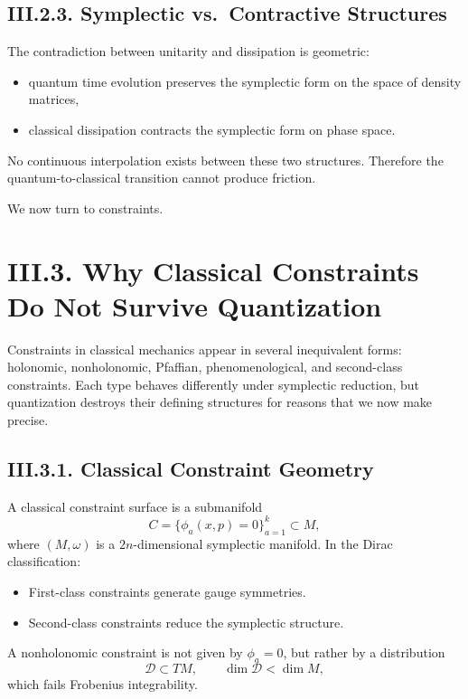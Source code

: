 \documentclass[12pt,oneside]{book}
\theoremstyle{plain}
\theoremstyle{definition}
\begin{document}
\subsection*{III.2.3. Symplectic vs.\ Contractive Structures}

The contradiction between unitarity and dissipation is geometric:

\begin{itemize}
    \item quantum time evolution preserves the symplectic form on the space of
    density matrices,
    \item classical dissipation contracts the symplectic form on phase space.
\end{itemize}

No continuous interpolation exists between these two structures. Therefore the
quantum-to-classical transition cannot produce friction.

We now turn to constraints.


\section{III.3. Why Classical Constraints Do Not Survive Quantization}

Constraints in classical mechanics appear in several inequivalent forms:
holonomic, nonholonomic, Pfaffian, phenomenological, and second-class
constraints. Each type behaves differently under symplectic reduction, but
quantization destroys their defining structures for reasons that we now make
precise.

\subsection*{III.3.1. Classical Constraint Geometry}

A classical constraint surface is a submanifold
\[
C = \{\phi_a(x,p)=0\}_{a=1}^k \subset M,
\]
where $(M,\omega)$ is a $2n$-dimensional symplectic manifold. In the Dirac
classification:

\begin{itemize}
    \item First-class constraints generate gauge symmetries.
    \item Second-class constraints reduce the symplectic structure.
\end{itemize}

A nonholonomic constraint is not given by $\phi_a=0$, but rather by a
distribution
\[
\mathcal{D} \subset TM, \qquad \dim\mathcal{D}<\dim M,
\]
which fails Frobenius integrability.
\end{document}
